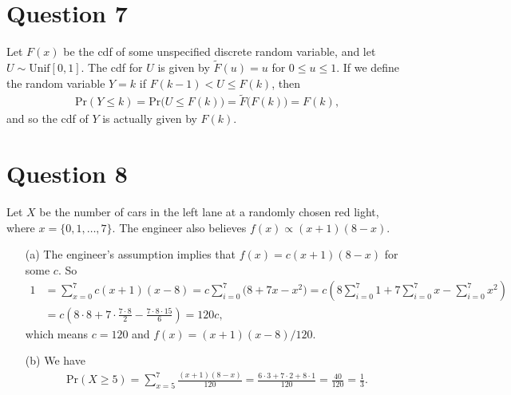 \documentclass[10pt]{article}
\begin{document}
\section{Question 7} \noindent
Let \(F(x)\) be the cdf of some unspecified discrete random variable,
and let \(U \sim \mathrm{Unif}[0,1]\).
The cdf for \(U\) is given by \(\tilde{F}(u) = u\) for \(0 \le u \le 1\). 
If we define the random variable \(Y = k\) if \(F(k-1) < U \le F(k)\), then 
\begin{align*}
    \mathrm{Pr}(Y \le k) = \mathrm{Pr} \big( U \le F(k) \big) = \tilde{F} \big( F(k) \big) = F(k),
\end{align*}
and so the cdf of \(Y\) is actually given by \(F(k)\). 

\section{Question 8} \noindent
Let \(X\) be the number of cars in the left lane at a randomly chosen red light, where \(x = \{0,1,\ldots,7\}\). 
The engineer also believes \(f(x) \propto (x+1)(8-x)\).
\begin{itemize}
    \item[(a)] The engineer's assumption implies that \(f(x) = c(x+1)(8-x)\) for some \(c\). So 
    \begin{align*}
        1 &= \sum_{x=0}^7 c (x+1)(x-8)
        = c \sum_{i=0}^7 \big( 8 + 7x - x^2 \big)
        = c \left( 8 \sum_{i=0}^7 1 + 7 \sum_{i=0}^7 x - \sum_{i=0}^7 x^2 \right) \\
        &= c \left( 8\cdot 8 + 7 \cdot \frac{7 \cdot 8}{2} - \frac{7 \cdot 8 \cdot 15}{6} \right)
        = 120c,
    \end{align*}
    which means \(c = 120\) and \(f(x) = (x+1)(x-8)/120\). 
    \item[(b)] We have 
    \begin{align*}
        \mathrm{Pr}(X \ge 5) = \sum_{x=5}^7 \frac{(x+1)(8-x)}{120}
        = \frac{6\cdot 3 + 7 \cdot 2 + 8 \cdot 1}{120} = \frac{40}{120} = \frac{1}{3}.
    \end{align*}
\end{itemize}
\end{document}
